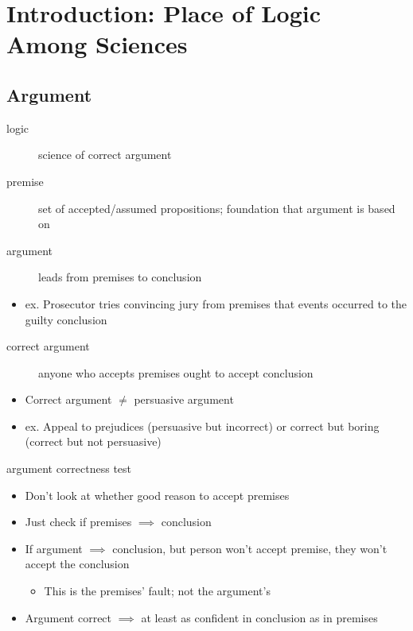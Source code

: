 \section{Introduction: Place of Logic Among Sciences}
\subsection{Argument}
\begin{description}
	\item[logic] science of correct argument
	\item[premise] set of accepted/assumed propositions; foundation that argument is
		based on
	\item[argument] leads from premises to conclusion
\end{description}

\begin{itemize}
	\item ex. Prosecutor tries convincing jury from premises that events
	      occurred to the guilty conclusion
\end{itemize}

\begin{description}
	\item[correct argument] anyone who accepts premises ought to accept
		conclusion
\end{description}

\begin{itemize}
	\item Correct argument $\neq$ persuasive argument
	\item ex. Appeal to prejudices (persuasive but incorrect) or correct but
	      boring (correct but not persuasive)
\end{itemize}

\begin{description}
	\item[argument correctness test]
\end{description}
\begin{itemize}
	\item Don't look at whether good reason to accept premises
	\item Just check if premises $\implies$ conclusion
	\item If argument $\implies$ conclusion, but person won't accept premise,
	      they won't accept the conclusion
	      \begin{itemize}
		      \item This is the premises' fault; not the argument's
	      \end{itemize}
	\item Argument correct $\implies$ at least as confident in conclusion
	      as in premises
\end{itemize}

